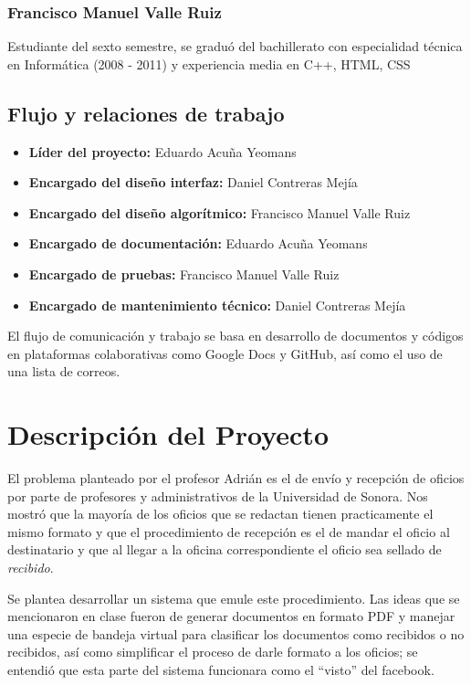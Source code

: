 \documentclass[letterpaper]{article}
\begin{document}
\subsubsection*{Francisco Manuel Valle Ruiz}
Estudiante del sexto semestre, se graduó del bachillerato con especialidad técnica en Informática (2008 - 2011) y experiencia media en C++, HTML, CSS 

\subsection{Flujo y relaciones de trabajo}
\begin{itemize}
\item \textbf{Líder del proyecto:} Eduardo Acuña Yeomans
\item \textbf{Encargado del diseño interfaz:} Daniel Contreras Mejía
\item \textbf{Encargado del diseño algorítmico:} Francisco Manuel Valle Ruiz
\item \textbf{Encargado de documentación:} Eduardo Acuña Yeomans
\item \textbf{Encargado de pruebas:} Francisco Manuel Valle Ruiz
\item \textbf{Encargado de mantenimiento técnico:} Daniel Contreras Mejía 
\end{itemize}

El flujo de comunicación y trabajo se basa en desarrollo de documentos y códigos en plataformas colaborativas como Google Docs y GitHub, así como el uso de una lista de correos.

\section{Descripción del Proyecto}
El problema planteado por el profesor Adrián es el de envío y recepción de oficios por parte de profesores y administrativos de la Universidad de Sonora. Nos mostró que la mayoría de los oficios que se redactan tienen practicamente el mismo formato y que el procedimiento de recepción es el de mandar el oficio al destinatario y que al llegar a la oficina correspondiente el oficio sea sellado de \emph{recibido}.

Se plantea desarrollar un sistema que emule este procedimiento. Las ideas que se mencionaron en clase fueron de generar documentos en formato PDF y manejar una especie de bandeja virtual para clasificar los documentos como recibidos o no recibidos, así como simplificar el proceso de darle formato a los oficios; se entendió que esta parte del sistema funcionara como el ``visto'' del facebook.
\end{document}
